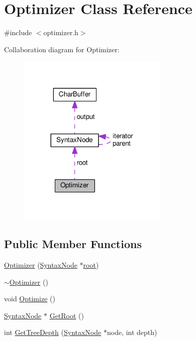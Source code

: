 \hypertarget{classOptimizer}{}\section{Optimizer Class Reference}
\label{classOptimizer}


{\ttfamily \#include $<$optimizer.\+h$>$}



Collaboration diagram for Optimizer\+:\nopagebreak
\begin{figure}[H]
\begin{center}
\leavevmode
\includegraphics[width=203pt]{classOptimizer__coll__graph}
\end{center}
\end{figure}
\subsection*{Public Member Functions}
\begin{DoxyCompactItemize}
\item 
\hyperlink{classOptimizer_a7b4482e542418f5b32a1c9960428c54a}{Optimizer} (\hyperlink{classSyntaxNode}{Syntax\+Node} $\ast$\hyperlink{classOptimizer_a665ceeca2e548de6fc68827fb910bd98}{root})
\item 
\hyperlink{classOptimizer_ab01202385afea2f09afbd73227736a17}{$\sim$\+Optimizer} ()
\item 
void \hyperlink{classOptimizer_a5764ae0825fa43921f74d8b972e53b1e}{Optimize} ()
\item 
\hyperlink{classSyntaxNode}{Syntax\+Node} $\ast$ \hyperlink{classOptimizer_ae50ae3a88ea8f5161b9bb072ccf4ea93}{Get\+Root} ()
\item 
int \hyperlink{classOptimizer_a4a80c3e845604f1ea53a6bfc187b2bba}{Get\+Tree\+Depth} (\hyperlink{classSyntaxNode}{Syntax\+Node} $\ast$node, int depth)
\end{DoxyCompactItemize}
